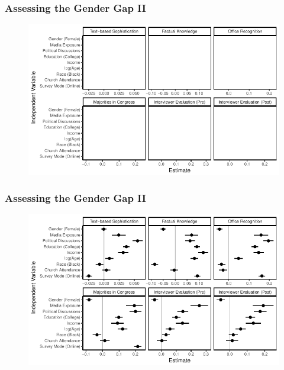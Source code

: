 \documentclass{beamer}
\begin{document}
\begin{frame} %
\frametitle{Assessing the Gender Gap II}
  \begin{figure}
  \includegraphics[width = \textwidth]{../fig/determinants_empty.pdf}
  \end{figure}
\end{frame}
\begin{frame} %
\frametitle{Assessing the Gender Gap II}
  \begin{figure}
  \includegraphics[width = \textwidth]{../fig/determinants.pdf}
  \end{figure}
\end{frame}


\end{document}
